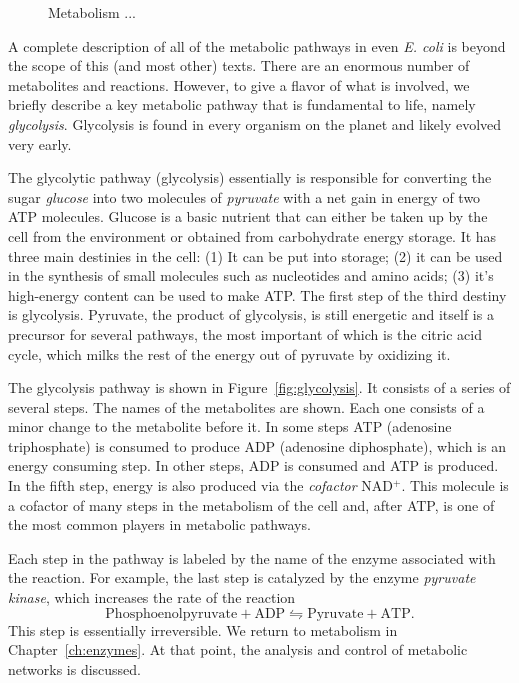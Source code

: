 \begin{figure}
\centering
{}
\caption{\label{fig:metabolism-overview}
  Metabolism ... }
\end{figure}

A complete description of all of the metabolic pathways in even {\em
  E. coli} is beyond the scope of this (and most other) texts. There are
an enormous number of metabolites and reactions. However, to give a
flavor of what is involved, we briefly describe a key metabolic
pathway that is fundamental to life, namely {\em
  glycolysis}. Glycolysis is found in every organism on the planet and
likely evolved very early.

The glycolytic pathway (glycolysis) essentially is responsible for
converting the sugar {\em glucose} into two molecules of {\em
  pyruvate} with a net gain in energy of two ATP molecules. Glucose is
a basic nutrient that can either be taken up by the cell from the
environment or obtained from carbohydrate energy storage. It has three
main destinies in the cell: (1) It can be put into storage; (2) it can
be used in the synthesis of small molecules such as nucleotides and
amino acids; (3) it's high-energy content can be used to make
ATP. The first step of the third destiny is glycolysis. Pyruvate, the
product of glycolysis, is still energetic and itself is a precursor
for several pathways, the most important of which is the citric acid
cycle, which milks the rest of the energy out of pyruvate by oxidizing
it.

The glycolysis pathway is shown in Figure~\ref{fig:glycolysis}. It
consists of a series of several steps. The names of the metabolites
are shown. Each one consists of a minor change to the metabolite
before it. In some steps ATP (adenosine triphosphate) is consumed to
produce ADP (adenosine diphosphate), which is an energy consuming
step. In other steps, ADP is consumed and ATP is produced. In the fifth
step, energy is also produced via the {\em cofactor} NAD$^+$. This
molecule is a cofactor of many steps in the metabolism of the cell
and, after ATP, is one of the most common players in metabolic
pathways. 

Each step in the pathway is labeled by the name of the enzyme
associated with the reaction. For example, the last step is catalyzed
by the enzyme {\em pyruvate kinase}, which increases the rate of the
reaction
%
$$
\mathrm{Phosphoenolpyruvate} + \mathrm{ADP}
  \leftrightharpoons \mathrm{Pyruvate} + \mathrm{ATP}.
$$
%
This step is essentially irreversible. We return to metabolism in
Chapter~\ref{ch:enzymes}. At that point, the analysis and control of
metabolic networks is discussed.

